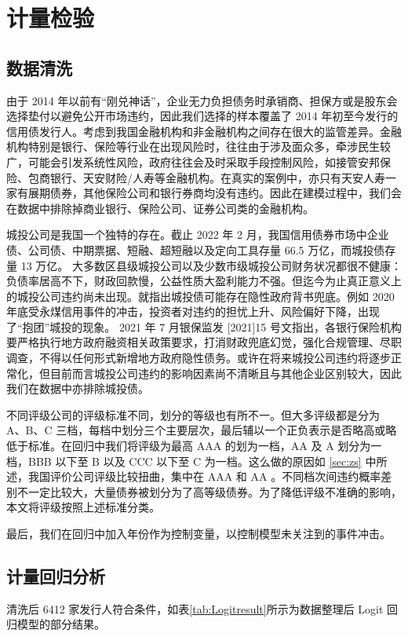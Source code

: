 
\chapter{计量检验}
\section{数据清洗}
由于 2014 年以前有“刚兑神话”，企业无力负担债务时承销商、担保方或是股东会选择垫付以避免公开市场违约，因此我们选择的样本覆盖了 2014 年初至今发行的信用债发行人。考虑到我国金融机构和非金融机构之间存在很大的监管差异。金融机构特别是银行、保险等行业在出现风险时，往往由于涉及面众多，牵涉民生较广，可能会引发系统性风险，政府往往会及时采取手段控制风险，如接管安邦保险、包商银行、天安财险/人寿等金融机构。在真实的案例中，亦只有天安人寿一家有展期债券，其他保险公司和银行券商均没有违约。因此在建模过程中，我们会在数据中排除掉商业银行、保险公司、证券公司类的金融机构。

城投公司是我国一个独特的存在。截止 2022 年 2 月，我国信用债券市场中企业债、公司债、中期票据、短融、超短融以及定向工具存量 66.5 万亿，而城投债存量 13 万亿。
大多数区县级城投公司以及少数市级城投公司财务状况都很不健康：负债率居高不下，财政回款慢，公益性质大盈利能力不强。但迄今为止真正意义上的城投公司违约尚未出现。\Textcite{钟辉勇2016城投债的担保可信吗}就指出城投债可能存在隐性政府背书兜底。例如 2020 年底受永煤信用事件的冲击，投资者对违约的担忧上升、风险偏好下降，出现了“抱团”城投的现象。
2021 年 7 月银保监发 [2021]15 号文指出，各银行保险机构要严格执行地方政府融资相关政策要求，打消财政兜底幻觉，强化合规管理、尽职调查，不得以任何形式新增地方政府隐性债务。或许在将来城投公司违约将逐步正常化，但目前而言城投公司违约的影响因素尚不清晰且与其他企业区别较大，因此我们在数据中亦排除城投债。

不同评级公司的评级标准不同，划分的等级也有所不一。但大多评级都是分为 A、B、C 三档，每档中划分三个主要层次，最后辅以一个正负表示是否略高或略低于标准。在回归中我们将评级为最高 AAA 的划为一档，AA 及 A 划分为一档，BBB 以下至 B 以及 CCC 以下至 C 为一档。这么做的原因如 \ref{sec:zs} 中所述，我国评价公司评级比较扭曲，集中在 AAA 和 AA 。不同档次间违约概率差别不一定比较大，大量债券被划分为了高等级债券。为了降低评级不准确的影响，本文将评级按照上述标准分类。

最后，我们在回归中加入年份作为控制变量，以控制模型未关注到的事件冲击。

\section{计量回归分析}
清洗后 6412 家发行人符合条件，如表\ref{tab:Logitresult}所示为数据整理后 Logit 回归模型的部分结果。

